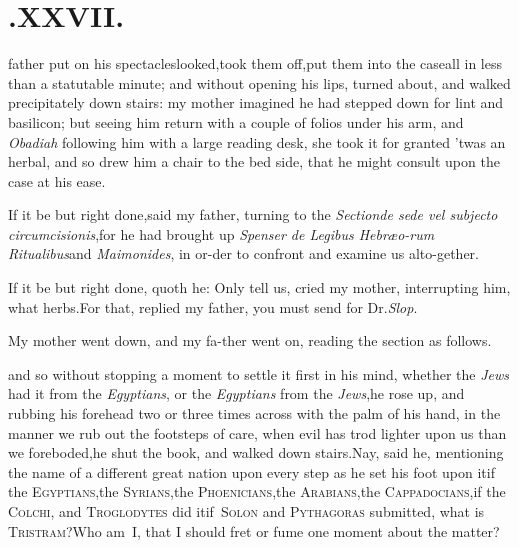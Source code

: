 \documentclass{article}
\begin{document}
\section{.\enspace  XXVII.}

 father put on his
spectacles\tsk looked,\tsk took them off,\tsk put them into
the case\tsk all in less than a statutable minute; and without
opening his lips, turned about, and walked precipitately down
stairs: my mother imagined he had stepped down for lint and
basilicon; but seeing him return with a couple of folios under his
arm, and \textit{Obadiah} following him with a large reading
desk,
she took it for granted ’twas an herbal, and so drew him a
chair to the bed side, that he might consult upon the case at his
ease.

\tsk If it be but right done,\tsk said my father, turning to the
\textit{Section\tsk de sede vel subjecto circumcisionis},\tsk for he had
brought up \textit{Spenser de Legibus
Hebræo-\break rum Ritualibus}\tsk and
\textit{Maimonides}, in or-\break der to confront and examine us alto-\break gether.\tsk

\tsh If it be but right done, quoth he:\break
\tsk Only tell
us, cried my mother, inter\-rupting him, what herbs.\tsk For that,\break
replied my father, you must send for\break 
Dr.\@ \textit{Slop}.

My mother went down, and my fa-\break ther went on, reading the section
as\break
follows.

\noindent
\stick{\indent \astfill}\break
\stick{\astfill}
\stick{\astfill}
\stick{\astfill}
\break
\tsh and so without stopping a moment to settle\etpp
it first in his mind, whether the \textit{Jews} had it from the
\textit{Egyptians}, or the \textit{Egyptians} from the
\textit{Jews},\tsk he rose up, and rubbing his forehead two or
three times across with the palm of his hand, in the
manner we rub out the footsteps of care, when evil has trod lighter
upon us than we foreboded,\tsk he shut the book, and walked down
stairs.\tsk Nay, said he, mentioning the name of a different
great nation upon every step as he set his foot upon it\tsk if
the \textsc{Egyptians},\tsk the
\textsc{Sy\-rians},\tsk the
\textsc{Phoenicians},\tsk the
\textsc{Ara\-bians},\tsk the
\textsc{Cappadocians},\tsh if the
\textsc{Colchi}, and \textsc{Troglodytes} did
it\tsh if~\textsc{Solon} and
\textsc{Pythagoras} submitted,\break
\tsk what is \textsc{Tristram}?\tsh Who am~I, that I should fret
or fume one moment\break
about the matter?
\end{document}
